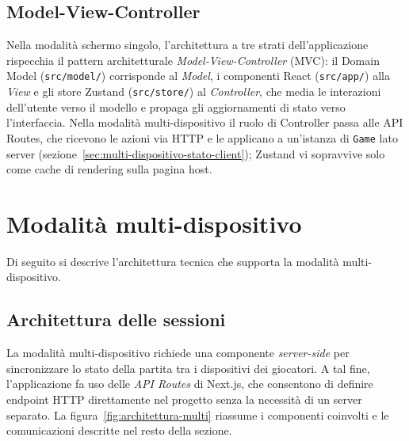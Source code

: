 \documentclass[12pt]{report}
\begin{document}
\subsection{Model-View-Controller}
\label{sec:mvc}
Nella modalità schermo singolo, l'architettura a tre strati dell'applicazione rispecchia il pattern architetturale \textit{Model-View-Controller} (MVC): il Domain Model (\texttt{src/model/}) corrisponde al \textit{Model}, i componenti React (\texttt{src/app/}) alla \textit{View} e gli store Zustand (\texttt{src/store/}) al \textit{Controller}, che media le interazioni dell'utente verso il modello e propaga gli aggiornamenti di stato verso l'interfaccia. Nella modalità multi-dispositivo il ruolo di Controller passa alle API Routes, che ricevono le azioni via HTTP e le applicano a un'istanza di \texttt{Game} lato server (sezione~\ref{sec:multi-dispositivo-stato-client}); Zustand vi sopravvive solo come cache di rendering sulla pagina host.

\section{Modalità multi-dispositivo}
\label{sec:multi-dispositivo}

Di seguito si descrive l'architettura tecnica che supporta la modalità multi-dispositivo.

\subsection{Architettura delle sessioni}

La modalità multi-dispositivo richiede una componente \textit{server-side} per sincronizzare lo stato della partita tra i dispositivi dei giocatori. A tal fine, l'applicazione fa uso delle \textit{API Routes} di Next.js, che consentono di definire endpoint HTTP direttamente nel progetto senza la necessità di un server separato. La figura~\ref{fig:architettura-multi} riassume i componenti coinvolti e le comunicazioni descritte nel resto della sezione.
\end{document}
